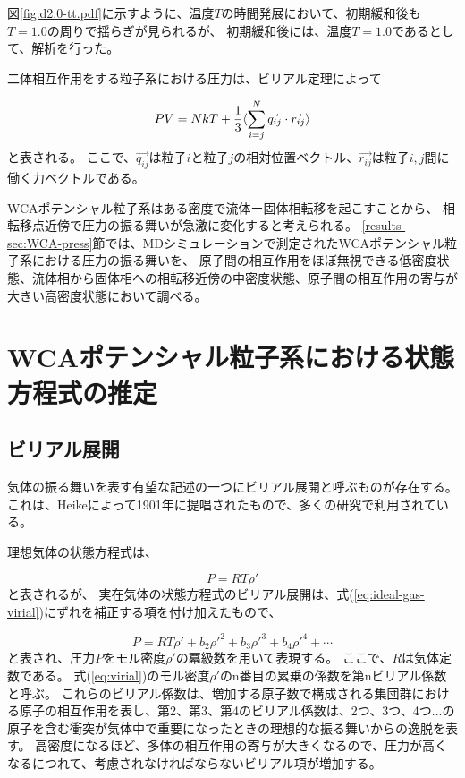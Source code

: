 \documentclass[titlepage]{jsreport}
\begin{document}
{{{図\ref{fig:d2.0-tt.pdf}に示すように、温度$T$の時間発展において、初期緩和後も$T=1.0$の周りで揺らぎが見られるが、
初期緩和後には、温度$T=1.0$であるとして、解析を行った。


\newpage
二体相互作用をする粒子系における圧力は、ビリアル定理によって

\large
\begin{equation}
PV=NkT+{\frac{1}{3}}\langle\sum_{i=j}^N\vec{q_{ij}} \cdot \vec{r_{ij}}\rangle{\label{eq:Theoritical-pressure}}
\end{equation}
\normalsize
と表される\cite{Theoritical-pressure,virial-therom}。
ここで、$\vec{q_{ij}}$は粒子$i$と粒子$j$の相対位置ベクトル、$\vec{r_{ij}}$は粒子$i,j$間に働く力ベクトルである。

WCAポテンシャル粒子系はある密度で流体ー固体相転移を起こすことから、
相転移点近傍で圧力の振る舞いが急激に変化すると考えられる。
\ref{results-sec:WCA-press}節では、MDシミュレーションで測定されたWCAポテンシャル粒子系における圧力の振る舞いを、
原子間の相互作用をほぼ無視できる低密度状態、流体相から固体相への相転移近傍の中密度状態、原子間の相互作用の寄与が大きい高密度状態において調べる。

\section{WCAポテンシャル粒子系における状態方程式の推定}\label{method-sec:WCA-equation}


\subsection{ビリアル展開}\label{method-subsec:virial}
気体の振る舞いを表す有望な記述の一つにビリアル展開と呼ぶものが存在する。
これは、Heikeによって1901年に提唱されたもの\cite{virial-Heike}で、多くの研究で利用されている\cite{virial-expansion-example1,virial-expansion-example2,virial-expansion-example3}。

理想気体の状態方程式は、

\large
\begin{equation}
P=RT{\rho}' \label{eq:ideal-gas-virial}
\end{equation}
\normalsize
と表されるが、
実在気体の状態方程式のビリアル展開は、式(\ref{eq:ideal-gas-virial})にずれを補正する項を付け加えたもので、

\large
\begin{equation}
P=RT{\rho}'+b_2{{\rho}'}^2+b_3{{\rho}'}^3+b_4{{\rho}'}^4+\cdots \label{eq:virial}
\end{equation}
\normalsize
と表され、圧力$P$をモル密度${\rho}'$の冪級数を用いて表現する。
ここで、$R$は気体定数である。
式(\ref{eq:virial})のモル密度${\rho}'$のn番目の累乗の係数を第nビリアル係数と呼ぶ\cite{virial-expansion}。
これらのビリアル係数は、増加する原子数で構成される集団群における原子の相互作用を表し、第2、第3、第4のビリアル係数は、2つ、3つ、4つ...の原子を含む衝突が気体中で重要になったときの理想的な振る舞いからの逸脱を表す。
高密度になるほど、多体の相互作用の寄与が大きくなるので、圧力が高くなるにつれて、考慮されなければならないビリアル項が増加する\cite{virial-Heike}。

}}}
\end{document}
